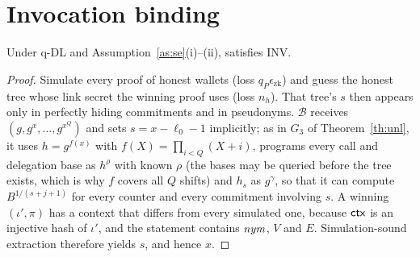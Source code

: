 \section{Invocation binding}\label{s:inv}
\begin{theorem}\label{th:inv}
Under q-DL and Assumption~\ref{as:se}(i)--(ii), \sys{} satisfies INV.
\end{theorem}
\begin{proof}
Simulate every proof of honest wallets (loss $q_P\epsilon_{\mathrm{zk}}$) and guess the honest tree whose link secret the winning proof uses (loss $n_h$). That tree's $s$ then appears only in perfectly hiding commitments and in pseudonyms. $\mathcal{B}$ receives $(g,g^{x},\dots,g^{x^{Q}})$ and sets $s=x-\ell_0-1$ implicitly; as in $G_3$ of Theorem~\ref{th:unl}, it uses $h=g^{f(x)}$ with $f(X)=\prod_{i<Q}(X+i)$, programs every call and delegation base as $h^{\rho}$ with known $\rho$ (the bases may be queried before the tree exists, which is why $f$ covers all $Q$ shifts) and $h_s$ as $g^{\gamma}$, so that it can compute $B^{1/(s+j+1)}$ for every counter and every commitment involving $s$. A winning $(\iota',\pi)$ has a context that differs from every simulated one, because $\mathsf{ctx}$ is an injective hash of $\iota'$, and the statement contains $\mathit{nym}$, $V$ and $E$. Simulation-sound extraction therefore yields $s$, and hence $x$.
\end{proof}

